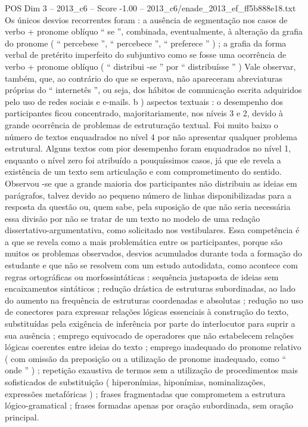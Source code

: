 \begin{textsample}{POS Dim 3 – 2013\_c6 – Score -1.00 – 2013\_c6/enade\_2013\_ef\_ff5b888e18.txt}
Os únicos desvios recorrentes foram : a ausência de segmentação nos casos de verbo + pronome oblíquo “ se ”, combinada, eventualmente, à alteração da grafia do pronome ( “ percebese ”, “ percebece ”, “ preferece ” ) ; a grafia da forma verbal de pretérito imperfeito do subjuntivo como se fosse uma ocorrência de verbo + pronome oblíquo ( “ distribui -se ” por “ distribuísse ” ) Vale observar, também, que, ao contrário do que se esperava, não apareceram abreviaturas próprias do “ internetês ”, ou seja, dos hábitos de comunicação escrita adquiridos pelo uso de redes sociais e e-mails. b ) aspectos textuais : o desempenho dos participantes ficou concentrado, majoritariamente, nos níveis 3 e 2, devido à grande ocorrência de problemas de estruturação textual.
Foi muito baixo o número de textos enquadrados no nível 4 por não apresentar qualquer problema estrutural.
Alguns textos com pior desempenho foram enquadrados no nível 1, enquanto o nível zero foi atribuído a pouquíssimos casos, já que ele revela a existência de um texto sem articulação e com comprometimento do sentido.
Observou -se que a grande maioria dos participantes não distribuiu as ideias em parágrafos, talvez devido ao pequeno número de linhas disponibilizadas para a resposta da questão ou, quem sabe, pela suposição de que não seria necessária essa divisão por não se tratar de um texto no modelo de uma redação dissertativo-argumentativa, como solicitado nos vestibulares.
Essa competência é a que se revela como a mais problemática entre os participantes, porque são muitos os problemas observados, desvios acumulados durante toda a formação do estudante e que não se resolvem com um estudo autodidata, como acontece com regras ortográficas ou morfossintáticas : sequência justaposta de ideias sem encaixamentos sintáticos ; redução drástica de estruturas subordinadas, ao lado do aumento na frequência de estruturas coordenadas e absolutas ; redução no uso de conectores para expressar relações lógicas essenciais à construção do texto, substituídas pela exigência de inferência por parte do interlocutor para suprir a sua ausência ; emprego equivocado de operadores que não estabelecem relações lógicas coerentes entre ideias do texto ; emprego inadequado do pronome relativo ( com omissão da preposição ou a utilização de pronome inadequado, como “ onde ” ) ; repetição exaustiva de termos sem a utilização de procedimentos mais sofisticados de substituição ( hiperonímias, hiponímias, nominalizações, expressões metafóricas ) ; frases fragmentadas que comprometem a estrutura lógico-gramatical ; frases formadas apenas por oração subordinada, sem oração principal.

\end{textsample}
